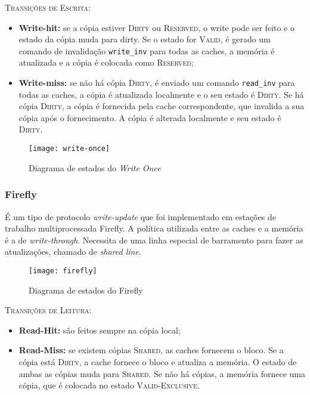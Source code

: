 \textsc{Transições de Escrita:}
\begin{itemize}
  \item \textbf{Write-hit:} se a cópia estiver \textsc{Dirty} ou \textsc{Reserved}, o write pode ser feito e o estado da cópia muda para dirty. Se o estado for \textsc{Valid}, é gerado um comando de invalidação \texttt{write\_inv} para todas as caches, a memória é atualizada e a cópia é colocada como \textsc{Reserved};

  \item \textbf{Write-miss:} se não há cópia \textsc{Dirty}, é enviado um comando \texttt{read\_inv} para todas as caches, a cópia é atualizada localmente e o seu estado é \textsc{Dirty}. Se há cópia \textsc{Dirty}, a cópia é fornecida pela cache correspondente, que invalida a sua cópia após o fornecimento. A cópia é alterada localmente e seu estado é \textsc{Dirty}.
\end{itemize}

\begin{figure}[ht]
  \centering
  \texttt{[image: write-once]}
  \label{fig:writeonce-automata}
  \caption{Diagrama de estados do \textit{Write Once}}
\end{figure}






\subsubsection{Firefly}
É um tipo de protocolo \textit{write-update} que foi implementado em estações de trabalho multiprocessada Firefly. A política utilizada entre as caches e a memória é a de \textit{write-through}. Necessita de uma linha especial de barramento para fazer as atualizações, chamado de \textit{shared line}.

\begin{figure}[ht]
  \centering
  \texttt{[image: firefly]}
  \label{fig:firefly-automata}
  \caption{Diagrama de estados do Firefly}
\end{figure}

\textsc{Transições de Leitura:}
\begin{itemize}
  \item \textbf{Read-Hit:} são feitos sempre na cópia local;

  \item \textbf{Read-Miss:} se existem cópias \textsc{Shared}, as caches fornecem o bloco. Se a cópia está \textsc{Dirty}, a cache fornece o bloco e atualiza a memória. O estado de ambas as cópias muda para \textsc{Shared}. Se não há cópias, a memória fornece uma cópia, que é colocada no estado \textsc{Valid-Exclusive}.
\end{itemize}

